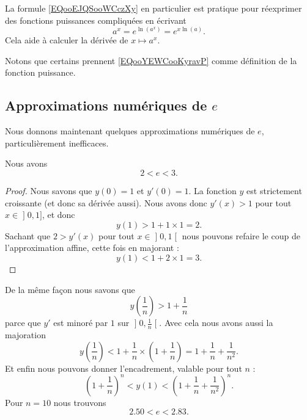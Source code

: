 La formule \eqref{EQooEJQSooWCczXy} en particulier est pratique pour réexprimer des fonctions puissances compliquées en écrivant
\begin{equation}        \label{EQooYEWCooKyravP}
    a^x= e^{\ln(a^x)}= e^{x\ln(a)}.
\end{equation}
Cela aide à calculer la dérivée de \( x\mapsto a^x\). 

Notons que certains prennent \eqref{EQooYEWCooKyravP} comme définition de la fonction puissance.

\subsection{Approximations numériques de \( e\)}

Nous donnons maintenant quelques approximations numériques de \( e\), particulièrement inefficaces.

\begin{lemma}
    Nous avons
    \begin{equation}
        2<e<3.
    \end{equation}
\end{lemma}

\begin{proof}
    Nous savons que \( y(0)=1\) et \( y'(0)=1\). La fonction \( y\) est strictement croissante (et donc sa dérivée aussi). Nous avons donc \( y'(x)>1\) pour tout \( x\in\mathopen] 0 , 1 \mathclose]\), et donc
    \begin{equation}
        y(1)>1+1\times 1=2.
    \end{equation}
    Sachant que \( 2>y'(x)\) pour tout \( x\in \mathopen] 0 , 1 \mathclose[\) nous pouvons refaire le coup de l'approximation affine, cette fois en majorant :
        \begin{equation}
            y(1)<1+2\times 1=3.
        \end{equation}
\end{proof}

De la même façon nous savons que
\begin{equation}
    y(\frac{1}{ n })>1+\frac{1}{ n }
\end{equation}
parce que \( y'\) est minoré par \( 1\) sur \( \mathopen] 0 , \frac{1}{ n } \mathclose[\). Avec cela nous avons aussi la majoration
\begin{equation}
    y(\frac{1}{ n })<1+\frac{1}{ n }\times \left( 1+\frac{1}{ n } \right)=1+\frac{1}{ n }+\frac{1}{ n^2 }.
\end{equation}
Et enfin nous pouvons donner l'encadrement, valable pour tout \( n\) :
\begin{equation}
    \left( 1+\frac{1}{ n } \right)^n<y(1)<\left( 1+\frac{1}{ n }+\frac{1}{ n^2 } \right)^n.
\end{equation}
Pour \( n=10\) nous trouvons
\begin{equation}
    2.50<e<2.83.
\end{equation}

